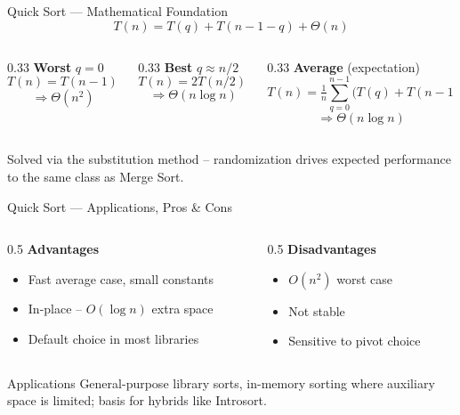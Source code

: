 \documentclass[9pt,aspectratio=169]{beamer}
\begin{document}
\begin{frame}{Quick Sort --- Mathematical Foundation}
\[
T(n) = T(q) + T(n-1-q) + \Theta(n)
\]
\begin{columns}[T]
\begin{column}{0.33\textwidth}
\textbf{\color{warnRed}Worst} \(q=0\)
\[T(n)=T(n-1)+\Theta(n)\]
\[\Rightarrow \Theta(n^2)\]
\end{column}
\begin{column}{0.33\textwidth}
\textbf{\color{teal}Best} \(q\approx n/2\)
\[T(n)=2T(n/2)+\Theta(n)\]
\[\Rightarrow \Theta(n\log n)\]
\end{column}
\begin{column}{0.33\textwidth}
\textbf{Average} (expectation)
\[T(n)=\tfrac1n\sum_{q=0}^{n-1}\!\big(T(q)+T(n{-}1{-}q)\big)+\Theta(n)\]
\[\Rightarrow \Theta(n\log n)\]
\end{column}
\end{columns}
\vspace{3mm}
\small\color{grey} Solved via the substitution method -- randomization drives expected performance to the same class as Merge Sort.
\end{frame}

\begin{frame}{Quick Sort --- Applications, Pros \& Cons}
\begin{columns}[T]
\begin{column}{0.5\textwidth}
\textbf{\color{teal}Advantages}
\begin{itemize}
  \item Fast average case, small constants
  \item In-place -- \(O(\log n)\) extra space
  \item Default choice in most libraries
\end{itemize}
\end{column}
\begin{column}{0.5\textwidth}
\textbf{\color{warnRed}Disadvantages}
\begin{itemize}
  \item \(O(n^2)\) worst case
  \item Not stable
  \item Sensitive to pivot choice
\end{itemize}
\end{column}
\end{columns}
\vspace{2mm}
\begin{block}{Applications}
\small General-purpose library sorts, in-memory sorting where auxiliary space is limited; basis for hybrids like Introsort.
\end{block}
\end{frame}
\end{document}
